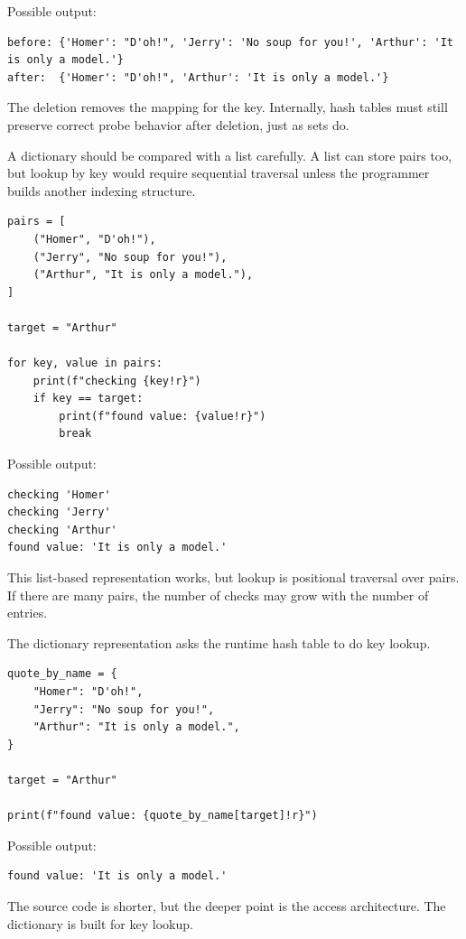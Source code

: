 Possible output:

\begin{verbatim}
before: {'Homer': "D'oh!", 'Jerry': 'No soup for you!', 'Arthur': 'It is only a model.'}
after:  {'Homer': "D'oh!", 'Arthur': 'It is only a model.'}
\end{verbatim}

The deletion removes the mapping for the key. Internally, hash tables must still preserve correct probe behavior after deletion, just as sets do.

A dictionary should be compared with a list carefully. A list can store pairs too, but lookup by key would require sequential traversal unless the programmer builds another indexing structure.

\begin{verbatim}
pairs = [
    ("Homer", "D'oh!"),
    ("Jerry", "No soup for you!"),
    ("Arthur", "It is only a model."),
]

target = "Arthur"

for key, value in pairs:
    print(f"checking {key!r}")
    if key == target:
        print(f"found value: {value!r}")
        break
\end{verbatim}

Possible output:

\begin{verbatim}
checking 'Homer'
checking 'Jerry'
checking 'Arthur'
found value: 'It is only a model.'
\end{verbatim}

This list-based representation works, but lookup is positional traversal over pairs. If there are many pairs, the number of checks may grow with the number of entries.

The dictionary representation asks the runtime hash table to do key lookup.

\begin{verbatim}
quote_by_name = {
    "Homer": "D'oh!",
    "Jerry": "No soup for you!",
    "Arthur": "It is only a model.",
}

target = "Arthur"

print(f"found value: {quote_by_name[target]!r}")
\end{verbatim}

Possible output:

\begin{verbatim}
found value: 'It is only a model.'
\end{verbatim}

The source code is shorter, but the deeper point is the access architecture. The dictionary is built for key lookup.

